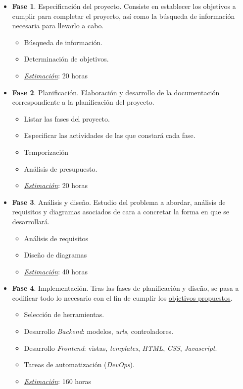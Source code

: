 \begin{itemize}
	\item \textbf{Fase 1}. Especificación del proyecto. Consiste en establecer los objetivos a cumplir para completar el proyecto, así como la búsqueda de información necesaria para llevarlo a cabo.
	\begin{itemize}
		\item Búsqueda de información.
		\item Determinación de objetivos.
		\item \underline{\textit{Estimación}}: 20 horas
	\end{itemize}
	
	\item \textbf{Fase 2}. Planificación. Elaboración y desarrollo de la documentación correspondiente a la planificación del proyecto.
	\begin{itemize}
		\item Listar las fases del proyecto.
		\item Especificar las actividades de las que constará cada fase.
		\item Temporización
		\item Análisis de presupuesto.
		\item \underline{\textit{Estimación}}: 20 horas
	\end{itemize}
	
	\item \textbf{Fase 3}. Análisis y diseño. Estudio del problema a abordar, análisis de requisitos y diagramas asociados de cara a concretar la forma en que se desarrollará.
	\begin{itemize}
		\item Análisis de requisitos
		\item Diseño de diagramas
		\item \underline{\textit{Estimación}}: 40 horas
	\end{itemize}
	
	\item \textbf{Fase 4}. Implementación. Tras las fases de planificación y diseño, se pasa a codificar todo lo necesario con el fin de cumplir los \hyperref[cap:objetivos]{objetivos propuestos}.
	\begin{itemize}
		\item Selección de herramientas.
		\item Desarrollo \textit{Backend}: modelos, \textit{urls}, controladores.
		\item Desarrollo \textit{Frontend}: vistas, \textit{templates}, \textit{HTML}, \textit{CSS}, \textit{Javascript}.
		\item Tareas de automatización (\textit{DevOps}).
		\item \underline{\textit{Estimación}}: 160 horas
	\end{itemize}
	

\end{itemize}
